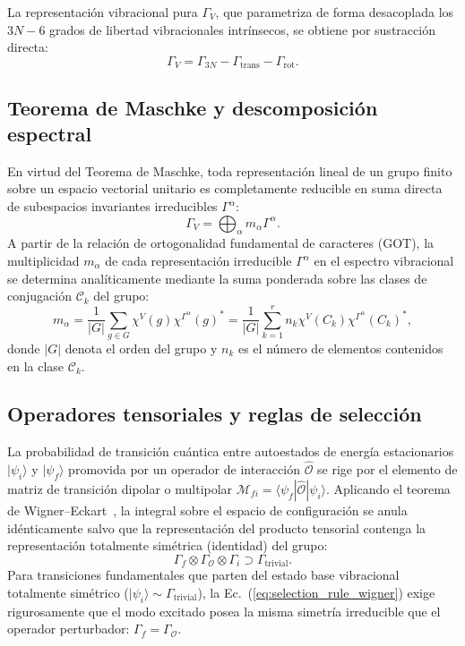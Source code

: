 La representación vibracional pura $\Gamma_V$, que parametriza de forma desacoplada los $3N - 6$ grados de libertad vibracionales intrínsecos, se obtiene por sustracción directa:
\begin{equation}
\Gamma_V = \Gamma_{3N} - \Gamma_{\text{trans}} - \Gamma_{\text{rot}}.
\label{eq:gamma_vib_def}
\end{equation}

\subsection{Teorema de Maschke y descomposición espectral}
En virtud del Teorema de Maschke, toda representación lineal de un grupo finito sobre un espacio vectorial unitario es completamente reducible en suma directa de subespacios invariantes irreducibles $\Gamma^\alpha$:
\begin{equation}
\Gamma_V = \bigoplus_{\alpha} m_\alpha \Gamma^\alpha.
\end{equation}
A partir de la relación de ortogonalidad fundamental de caracteres (GOT), la multiplicidad $m_\alpha$ de cada representación irreducible $\Gamma^\alpha$ en el espectro vibracional se determina analíticamente mediante la suma ponderada sobre las clases de conjugación $\mathcal{C}_k$ del grupo:
\begin{equation}
m_\alpha = \frac{1}{|G|} \sum_{g \in G} \chi^V(g) \chi^{\Gamma^\alpha}(g)^* = \frac{1}{|G|} \sum_{k=1}^r n_k \chi^V(C_k) \chi^{\Gamma^\alpha}(C_k)^*,
\label{eq:multiplicity}
\end{equation}
donde $|G|$ denota el orden del grupo y $n_k$ es el número de elementos contenidos en la clase $\mathcal{C}_k$.

\subsection{Operadores tensoriales y reglas de selección}
La probabilidad de transición cuántica entre autoestados de energía estacionarios $|\psi_i\rangle$ y $|\psi_f\rangle$ promovida por un operador de interacción $\hat{\mathcal{O}}$ se rige por el elemento de matriz de transición dipolar o multipolar $\mathcal{M}_{fi} = \langle \psi_f | \hat{\mathcal{O}} | \psi_i \rangle$. Aplicando el teorema de Wigner--Eckart~\cite{Wigner1959, Ramadevi2019}, la integral sobre el espacio de configuración se anula idénticamente salvo que la representación del producto tensorial contenga la representación totalmente simétrica (identidad) del grupo:
\begin{equation}
\Gamma_f \otimes \Gamma_{\mathcal{O}} \otimes \Gamma_i \supset \Gamma_{\text{trivial}}.
\label{eq:selection_rule_wigner}
\end{equation}
Para transiciones fundamentales que parten del estado base vibracional totalmente simétrico ($|\psi_i\rangle \sim \Gamma_{\text{trivial}}$), la Ec.~(\ref{eq:selection_rule_wigner}) exige rigurosamente que el modo excitado posea la misma simetría irreducible que el operador perturbador: $\Gamma_f = \Gamma_{\mathcal{O}}$.

